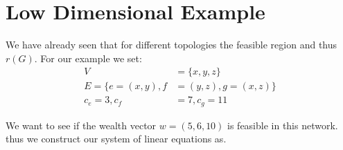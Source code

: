 \documentclass[10pt,twocolumn]{article}
\begin{document}
\appendix

\section{Low Dimensional Example}
\label{sec:paymentsExample}
We have already seen that for different topologies the feasible region and thus $r(G)$.
For our example we set:
\begin{equation*}
  \begin{split}
    V   & =\{x,y,z\} \\
    E=\{e=(x,y),f & =(y,z), g=(x,z)\}\\
    c_e=3, c_f & =7, c_g=11
  \end{split}
\end{equation*}

We want to see if the wealth vector $w=(5,6,10)$ is feasible in this network.
thus we construct our system of linear equations as.
\end{document}

